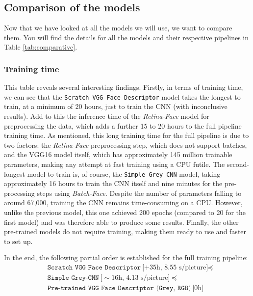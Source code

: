 \documentclass[9pt,twocolumn,twoside]{ilcss}
\theoremstyle{definition}
\theoremstyle{remark}
\theoremstyle{definition}
\theoremstyle{definition}
\begin{document}
    \subsection{Comparison of the models}

    Now that we have looked at all the models we will use, we want to compare them. You will find the details for all the models and their respective pipelines in Table \ref{tab:comparative}.

    \subsubsection*{Training time}
    This table reveals several interesting findings. Firstly, in terms of training time, we can see that the \texttt{Scratch VGG Face Descriptor} model takes the longest to train, at a minimum of 20 hours, just to train the CNN (with inconclusive results). Add to this the inference time of the \textit{Retina-Face} model for preprocessing the data, which adds a further 15 to 20 hours to the full pipeline training time. As mentioned, this long training time for the full pipeline is due to two factors: the \textit{Retina-Face} preprocessing step, which does not support batches, and the VGG16 model itself, which has approximately 145 million trainable parameters, making any attempt at fast training using a CPU futile.
    The second-longest model to train is, of course, the \texttt{Simple Grey-CNN} model, taking approximately 16 hours to train the CNN itself and nine minutes for the pre-processing steps using \textit{Batch-Face}. Despite the number of parameters falling to around 67,000, training the CNN remains time-consuming on a CPU. However, unlike the previous model, this one achieved 200 epochs (compared to 20 for the first model) and was therefore able to produce some results.
    Finally, the other pre-trained models do not require training, making them ready to use and faster to set up.
    
    In the end, the following partial order is established for the full training pipeline:
    \begin{align*}
       & \texttt{Scratch VGG Face Descriptor}\ \text{[+35h, 8.55 s/picture]} \preceq\\ 
       & \texttt{Simple Grey-CNN}\ \text{[}\!\sim\!\text{16h, 4.13 s/picture]} \preceq\\
       & \texttt{Pre-trained VGG Face Descriptor (Grey, RGB)}\ \text{[0h]}
    \end{align*}
\end{document}
